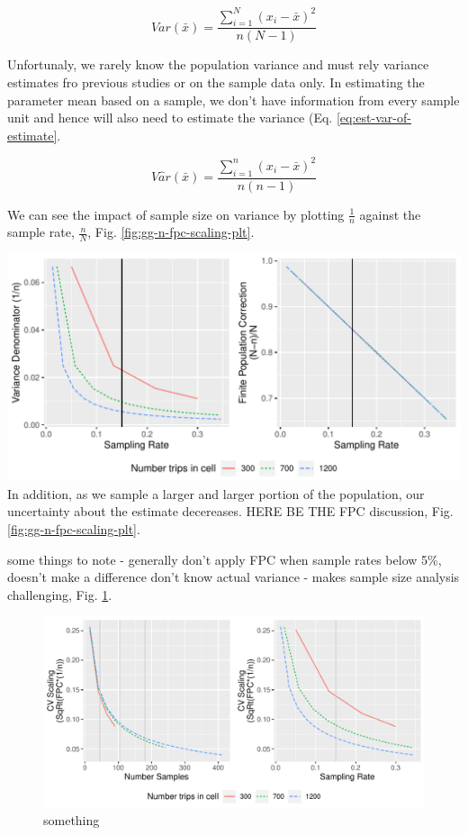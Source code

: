 \documentclass[
]{article}
\begin{document}
\begin{equation} 
  Var(\bar{x}) = \frac{\sum_{i=1}^{N}{\left(x_i - \bar{x}\right)^2}}{n\left(N-1\right)}  
  \label{eq:var-of-estimate}
\end{equation}

Unfortunaly, we rarely know the population variance and must rely variance
estimates fro previous studies or on the sample data only. In estimating the
parameter mean based on a sample, we don't have information from every sample
unit and hence will also need to estimate the variance
(Eq. \eqref{eq:est-var-of-estimate}.

\begin{equation} 
  V\hat{a}r(\bar{x}) = \frac{\sum_{i=1}^{n}{\left(x_i - \bar{x}\right)^2}}{n\left(n-1\right)}  
  \label{eq:est-var-of-estimate}
\end{equation}

We can see the impact of sample size on variance by plotting \(\frac{1}{n}\)
against the sample rate, \(\frac{n}{N}\), Fig. \ref{fig:gg-n-fpc-scaling-plt}.

\includegraphics{images/gg-n-fpc-scaling-plt-1.pdf}
In addition, as we sample a larger and larger portion of the population, our
uncertainty about the estimate decereases. HERE BE THE FPC discussion, Fig.
\ref{fig:gg-n-fpc-scaling-plt}.

some things to note -
generally don't apply FPC when sample rates below 5\%, doesn't make a difference
don't know actual variance - makes sample size analysis challenging, Fig.
\ref{fig:gg-totl-scaling-plt}.

\begin{figure}
\centering
\includegraphics{images/gg-totl-scaling-plt-1.pdf}
\caption{\label{fig:gg-totl-scaling-plt}something}
\end{figure}
\end{document}
